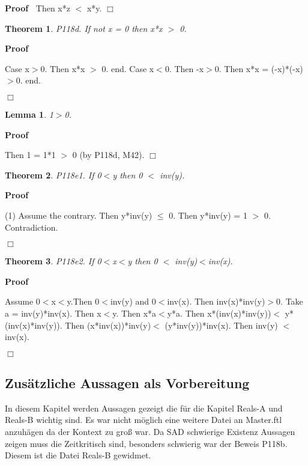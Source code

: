 \documentclass{article}
\newenvironment{forthel}{\begin{leftbar}}{\end{leftbar}}
\newenvironment{proof}{\noindent\textbf{Proof\ }}{\hspace*{\fill}$\Box$\medskip}
\newtheorem{lemma}{Lemma}
\newtheorem{theorem}{Theorem}
\begin{document}
\begin{forthel}
\begin{proof}
	Then x*z $<$ x*y.
	\end{proof}

	
	\begin{theorem}
 P118d. If not x = 0 then x*x $>$ 0.
\end{theorem}	\begin{proof}

	Case x$>$0. Then x*x $>$ 0.
	end.
	Case x$<$0. Then -x$>$0. Then x*x = (-x)*(-x)$>$0.
	end.
	
	\end{proof}

	\begin{lemma} 1$>$0. 

\end{lemma}
	\begin{proof}

	Then 1 = 1*1 $>$ 0 (by P118d, M42).
	\end{proof}

	
	\begin{theorem}
 P118e1. If 0$<$y then 0 $<$ inv(y).
\end{theorem}	\begin{proof}

	(1) Assume the contrary.
	Then y*inv(y) $\leq$ 0.
	Then y*inv(y) = 1 $>$ 0.
	Contradiction.
	
	\end{proof}

	\begin{theorem}
 P118e2. If 0$<$x$<$y then 0 $<$ inv(y)$<$inv(x).
\end{theorem}	\begin{proof}
 
	Assume 0$<$x$<$y.Then 0$<$inv(y) and 0$<$inv(x).
	Then inv(x)*inv(y)$>$0.
	Take a = inv(y)*inv(x).	
	Then x$<$y. Then x*a$<$y*a.
	Then x*(inv(x)*inv(y))$<$ y*(inv(x)*inv(y)).
	Then (x*inv(x))*inv(y)$<$ (y*inv(y))*inv(x).
	Then inv(y) $<$ inv(x).
	
	\end{proof}

	

\end{forthel}








\subsection{Zusätzliche Aussagen als Vorbereitung}
In diesem Kapitel werden Aussagen gezeigt die für die Kapitel Reals-A und Reals-B wichtig sind.
Es war nicht möglich eine weitere Datei an Master.ftl anzuhägen da der Kontext zu groß war.
Da SAD schwierige Existenz Aussagen zeigen muss die Zeitkritisch sind, besonders schwierig war der Beweis P118b. Diesem ist die Datei Reals-B gewidmet.
 
\end{document}
